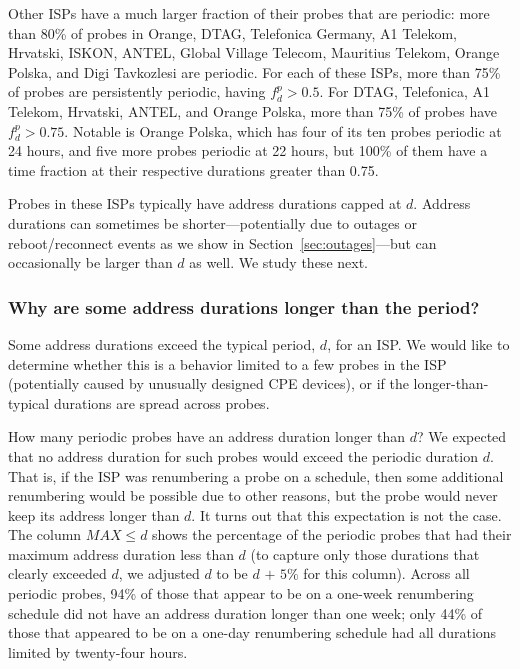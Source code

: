 Other ISPs have a much larger fraction of their
probes that are periodic: more than 80\% of
probes in Orange, DTAG, Telefonica Germany, A1 Telekom, Hrvat\-ski, ISK\-ON,
ANT\-EL, Global Village Telecom, Mauritius Telekom, 
Orange Polska, and Digi Tavkozlesi are periodic. 
For each of these ISPs, more than 75\% of probes are persistently
periodic, having $f^p_d > 0.5$.
For DTAG, Telefonica, A1 Telekom, Hrvatski, ANTEL, and Orange Polska, 
more than 75\% of probes have $f^p_d > 0.75$.
Notable is Orange Polska, which has four of its ten probes 
periodic at 24 hours, and five more probes periodic at 22
hours, but 100\% of them have a time fraction at their respective
durations greater than 0.75. 

Probes in these ISPs typically have
address durations capped at $d$. Address durations can sometimes be shorter---potentially due to outages or
reboot/reconnect events as we show in Section~\ref{sec:outages}---but
can occasionally be larger than $d$ as well. We study these next.

\subsubsection{Why are some address durations longer than the period?}

Some address durations exceed the typical period, $d$, for an ISP.  
We
would like to determine whether this is a behavior limited to a few
probes in the ISP (potentially caused by unusually designed CPE devices), or if the longer-than-typical durations are
spread across probes.  

How many periodic probes have an address duration longer
than $d$?  We expected that no address duration for such
probes would exceed the periodic duration $d$.  That
is, if the ISP was renumbering a probe on a schedule, then
some additional renumbering would be possible due to other
reasons, but the probe would never keep its address longer
than $d$.  It turns out that this expectation is not the
case.  The column $MAX \leq d$ shows the percentage of the
periodic probes that had their maximum address duration less than
$d$ (to capture only those durations that clearly exceeded
$d$, we adjusted $d$ to be $d$ $+$ $5\%$ for this column).  Across all periodic
probes, 94\% of those that appear to be on a one-week renumbering schedule 
did not have an address duration longer than one week; only 44\% of those
that appeared to be on a one-day renumbering schedule had all durations limited
by twenty-four hours.

